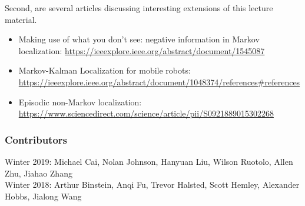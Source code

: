 \documentclass[twoside]{article}
\begin{document}
Second, are several articles discussing interesting extensions of this lecture material.

\begin{itemize}
    \item Making use of what you don't see: negative information in Markov localization: \url{https://ieeexplore.ieee.org/abstract/document/1545087}
    \item Markov-Kalman Localization for mobile robots: \url{https://ieeexplore.ieee.org/abstract/document/1048374/references#references}
    \item Episodic non-Markov localization: \url{https://www.sciencedirect.com/science/article/pii/S0921889015302268}
\end{itemize}

\printbibliography

\subsubsection*{Contributors}
Winter 2019: Michael Cai, Nolan Johnson, Hanyuan Liu, Wilson Ruotolo, Allen Zhu, Jiahao Zhang \\
Winter 2018: Arthur Binstein, Anqi Fu, Trevor Halsted, Scott Hemley, Alexander Hobbs, Jialong Wang 
\end{document}
